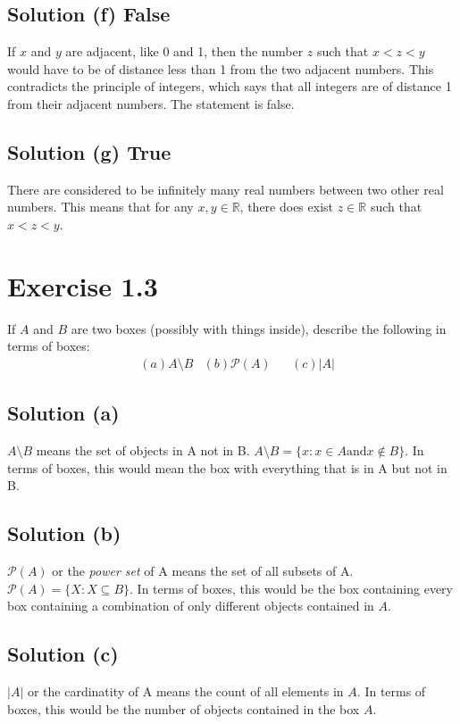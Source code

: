 \documentclass[12pt]{report}
\begin{document}
\subsection{Solution (f) False}
If $x$ and $y$ are adjacent, like 0 and 1, then the number $z$ such that $x < z < y$ would have to be of distance less than 1 from the two adjacent numbers. This contradicts the principle of integers, which says that all integers are of distance 1 from their adjacent numbers. The statement is false.

\subsection{Solution (g) True}
There are considered to be infinitely many real numbers between two other real numbers.
This means that for any $x, y \in \mathbb{R}$, there does exist $z \in \mathbb{R}$ such that $x < z < y$. 

\pagebreak
\section{Exercise 1.3}
If $A$ and $B$ are two boxes (possibly with things inside), describe the following in terms of boxes:
\begin{align*}
    &(a) A \setminus B 
    &(b) \mathcal{P}(A)
    &&(c) \left| A \right|
\end{align*} 

\subsection{Solution (a)}
$A \setminus B$ means the set of objects in A not in B. 
$A \setminus B = \{x: x \in A \text{and} x \notin B\}$. 
In terms of boxes, this would mean the box with everything that is in A but not in B.

\subsection{Solution (b)}
$\mathcal{P}(A)$ or the \textit{power set} of A means the set of all subsets of A.
\(\mathcal{P}(A) = \{X: X \subseteq B\}\).
In terms of boxes, this would be the box containing every box containing a combination of only different objects contained in $A$. 

\subsection{Solution (c)}
$\left| A \right|$ or the cardinatity of A means the count of all elements in $A$.
In terms of boxes, this would be the number of objects contained in the box $A$.
\end{document}
